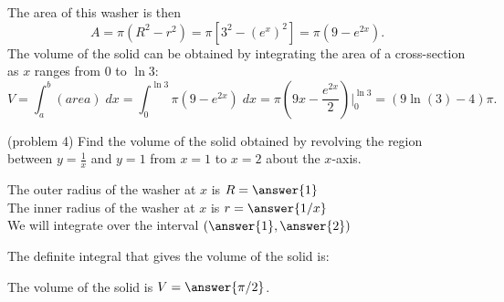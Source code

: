 \documentclass[handout]{ximera}
\begin{document}
\begin{example}[example 4]
\begin{image}
\end{image}


The area of this washer is then
\[
A = \pi (R^2 - r^2)  = \pi \left[3^2 - \left(e^x\right)^2\right]  = \pi \left(9 - e^{2x}\right) .
\]
The volume of the solid can be obtained by integrating the area of a cross-section as $x$ ranges from $0$ to $\ln 3$:
\[
V = \int_a^b (area) \; dx  = \int_0^{\ln 3} \pi \left(9 - e^{2x}\right) \; dx 
= \pi \left(9x - \frac{e^{2x}}{2}\right)\bigg|_0^{\ln 3} = \left(9\ln(3)-4\right)\pi.
\]



\end{example}




\begin{problem}(problem 4)
Find the volume of the solid obtained by revolving the region between $y= \frac{1}{x}$ and $y = 1$ from $x = 1$ to $x = 2$ about the $x$-axis.


The outer radius of the washer at $x$ is $R = \answer{1}$\\
The inner radius of the washer at $x$ is $r = \answer{1/x}$\\

We will integrate over the interval $\left(\answer{1},\answer{2}\right)$

The definite integral that gives the volume of the solid is:\\
\begin{multipleChoice}
\end{multipleChoice}

The volume of the solid is $V = \answer{\pi/2 }$.

\end{problem}
\end{document}
